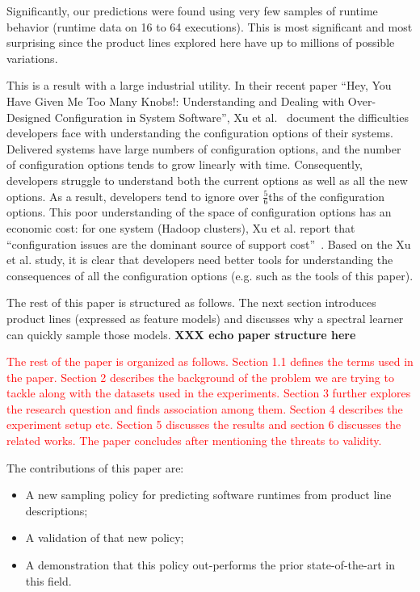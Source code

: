 \documentclass{sig-alternative}
\newcommand{\bi}{\begin{itemize}}%
\newcommand{\ei}{\end{itemize}}
\begin{document}
Significantly, our predictions were found using   very few samples of runtime behavior
(runtime data on 16 to 64 executions).
This is most significant and most surprising  since the product lines explored here have up
to millions of possible variations. 

This is a result with a large industrial utility.
In their recent paper ``Hey, You Have Given Me Too Many Knobs!: Understanding and Dealing with Over-Designed Configuration in System Software'', Xu et al.~\cite{xu2015hey} document the  difficulties developers face
with understanding  the configuration options of their systems.
Delivered systems have large numbers of configuration options, and the number of  configuration options tends to grow linearly
with time. Consequently, developers  struggle to understand both the current options as well as all the new options.
As a result, developers tend to ignore over $\frac{5}{6}$ths of the configuration options. 
This poor understanding of the space of configuration options has an economic cost:  for one system (Hadoop clusters),  Xu et al. report that ``configuration
issues are the dominant source of support cost''~\cite{xu2015hey}. 
Based on the Xu et al. study, it is clear that developers need better tools for understanding the 
consequences of all the configuration options (e.g. such as   the tools of this paper).



The rest of this paper is structured as follows. The next section introduces
product lines (expressed as feature models) and discusses why a spectral learner can
quickly sample those models. {\bf XXX echo paper
structure here}

\textcolor{red}{The rest of the paper is organized as follows. Section 1.1 defines the terms used in the paper. Section 2 describes the background of the problem we are trying to tackle along with the datasets used in the experiments. Section 3 further explores the research question and finds association among them. Section 4 describes the experiment setup etc. Section 5 discusses the results and section 6 discusses the related works. The paper concludes after mentioning the threats to validity.}

The contributions of this paper are:
\bi
\item A new sampling policy for predicting software runtimes from product line descriptions;
\item A validation of that new policy;
\item A demonstration that this policy out-performs the prior state-of-the-art in this field.
\ei
\end{document}
